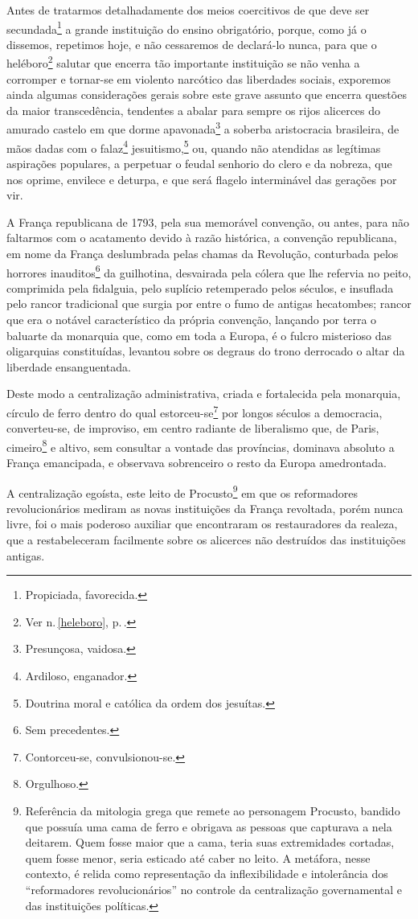 Antes de tratarmos detalhadamente dos meios coercitivos de que deve ser
secundada\footnote{Propiciada, favorecida.} a grande instituição do
ensino obrigatório, porque, como já o dissemos, repetimos hoje, e não
cessaremos de declará-lo nunca, para que o heléboro\footnote{Ver n.\,\ref{heleboro}, p.\,\pageref{heleboro}.} salutar
que encerra tão importante instituição se não venha a corromper e
tornar-se em violento narcótico das liberdades sociais, exporemos ainda
algumas considerações gerais sobre este grave assunto que encerra
questões da maior transcedência, tendentes a abalar para sempre os rijos
alicerces do amurado castelo em que dorme apavonada\footnote{
  Presunçosa, vaidosa.} a soberba aristocracia brasileira, de mãos dadas
com o falaz\footnote{Ardiloso, enganador.} jesuitismo,\footnote{
  Doutrina moral e católica da ordem dos jesuítas.} ou,
quando não atendidas as legítimas aspirações populares, a perpetuar o
feudal senhorio do clero e da nobreza, que nos oprime, envilece e
deturpa, e que será flagelo interminável das gerações por vir.

A França republicana de 1793, pela sua memorável convenção, ou antes,
para não faltarmos com o acatamento devido à razão histórica, a
convenção republicana, em nome da França deslumbrada pelas chamas da
Revolução, conturbada pelos horrores inauditos\footnote{Sem
  precedentes.} da guilhotina, desvairada pela cólera que lhe refervia
no peito, comprimida pela fidalguia, pelo suplício retemperado pelos
séculos, e insuflada pelo rancor tradicional que surgia por entre o fumo
de antigas hecatombes; rancor que era o notável característico da
própria convenção, lançando por terra o baluarte da monarquia que, como
em toda a Europa, é o fulcro misterioso das oligarquias constituídas,
levantou sobre os degraus do trono derrocado o altar da liberdade
ensanguentada.

Deste modo a centralização administrativa, criada e fortalecida pela
monarquia, círculo de ferro dentro do qual estorceu-se\footnote{
  Contorceu-se, convulsionou-se.} por longos séculos a democracia,
converteu-se, de improviso, em centro radiante de liberalismo que, de
Paris, cimeiro\footnote{Orgulhoso.} e altivo, sem consultar a vontade
das províncias, dominava absoluto a França emancipada, e observava
sobrenceiro o resto da Europa amedrontada.

A centralização egoísta, este leito de Procusto\footnote{Referência da
  mitologia grega que remete ao personagem Procusto, bandido que possuía
  uma cama de ferro e obrigava as pessoas que capturava a nela deitarem.
  Quem fosse maior que a cama, teria suas extremidades cortadas, quem
  fosse menor, seria esticado até caber no leito. A metáfora, nesse
  contexto, é relida como representação da inflexibilidade e
  intolerância dos ``reformadores revolucionários'' no controle da
  centralização governamental e das instituições políticas.} em que os
reformadores revolucionários mediram as novas instituições da França
revoltada, porém nunca livre, foi o mais poderoso auxiliar que
encontraram os restauradores da realeza, que a restabeleceram facilmente
sobre os alicerces não destruídos das instituições antigas.

